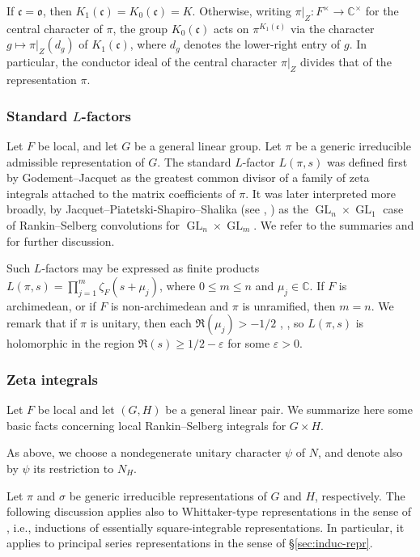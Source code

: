 \documentclass[reqno]{amsart}
\DeclareMathOperator{\GL}{GL}
\def\eps{\varepsilon}
\theoremstyle{plain} \newtheorem{theorem} {Theorem}
\theoremstyle{definition} \newtheorem{definition} [theorem] {Definition}
\theoremstyle{itplain} %
\numberwithin{equation}{section}
\numberwithin{theorem}{section}
\renewcommand{\geq}{\geqslant}
\renewcommand{\leq}{\leqslant}
\begin{document}
If $\mathfrak{c} = \mathfrak{o}$, then $K_1(\mathfrak{c}) = K_0(\mathfrak{c}) = K$.  Otherwise, writing $\pi|_Z : F^\times \rightarrow \mathbb{C}^\times$ for the central character of $\pi$, the group $K_0(\mathfrak{c})$ acts on $\pi^{K_1(\mathfrak{c})}$ via the character $g \mapsto \pi|_Z(d_g)$ of $K_1(\mathfrak{c})$, where $d_g$ denotes the lower-right entry of $g$.  In particular, the conductor ideal of the central character $\pi|_Z$ divides that of the representation $\pi$.

\subsubsection{Standard $L$-factors}\label{sec:standard-l-factors}
Let $F$ be local, and let $G$ be a general linear group.  Let $\pi$ be a generic irreducible admissible representation of $G$.  The standard $L$-factor $L(\pi,s)$ was defined first by Godement--Jacquet \cite{MR0342495} as the greatest common divisor of a family of zeta integrals attached to the matrix coefficients of $\pi$.  It was later interpreted more broadly, by Jacquet--Piatetski-Shapiro--Shalika (see \cite[\S5.1]{MR701565}, \cite[Thm 4.3]{MR519356}) as the $\GL_n \times \GL_1$ case of Rankin--Selberg convolutions for $\GL_n \times \GL_m$.  We refer to the summaries \cite{MR546609} and \cite[\S2 and Appendix]{MR1395406} for further discussion.

Such $L$-factors may be expressed as finite products $L(\pi,s) = \prod_{j=1}^m \zeta_F(s + \mu_{j})$, where $0 \leq m \leq n$ and $\mu_j \in \mathbb{C}$.  If $F$ is archimedean, or if $F$ is non-archimedean and $\pi$ is unramified, then $m = n$.  We remark that if $\pi$ is unitary, then each $\Re(\mu_j) > -1/2$ \cite[\S2.5]{MR618323}, \cite[Prop 2.1]{MR1277950}, so $L(\pi,s)$ is holomorphic in the region $\Re(s) \geq 1/2-\eps$ for some $\eps > 0$.


\subsubsection{Zeta integrals}\label{sec:zeta-integrals}
Let $F$ be local and let $(G,H)$ be a general linear pair.  We summarize here some basic facts concerning local Rankin--Selberg integrals for $G \times H$.

As above, we choose a nondegenerate unitary character $\psi$ of $N$, and denote also by $\psi$ its restriction to $N_H$.

Let $\pi$ and $\sigma$ be generic irreducible representations of $G$ and $H$, respectively.  The following discussion applies also to
Whittaker-type representations in the sense of \cite[\S1.5]{MR3753910}, i.e., inductions of essentially square-integrable representations.  In particular, it applies to principal series representations in the sense of \S\ref{sec:induc-repr}.
\end{document}
